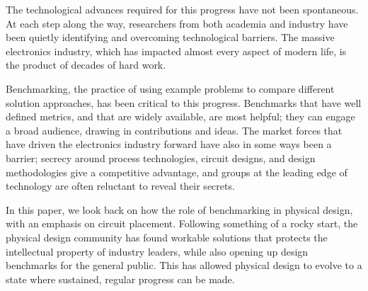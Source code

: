 \documentclass[sigconf]{acmart}
\begin{document}
The technological advances required for this progress
have not been spontaneous.  At each
step along the way, researchers from both academia and
industry have been quietly identifying and overcoming
technological barriers.  The massive electronics industry,
which has impacted almost every aspect of modern life,
is the product of decades of hard work.

Benchmarking, the practice of using example problems to compare
different solution approaches, has been critical to this progress.
Benchmarks that have well defined metrics, and that are widely
available, are most helpful; they can engage a broad audience, drawing
in contributions and ideas.  The market forces that have driven the
electronics industry forward have also in some ways been a barrier;
secrecy
around process technologies, circuit designs, and design methodologies
give a competitive advantage, and groups at the leading edge of
technology are often reluctant to reveal their secrets.

In this paper, we look back on how the role of benchmarking
in physical design, with an emphasis on circuit placement.
Following something of a rocky start, the physical design
community has found workable solutions that protects the
intellectual property of industry leaders, while also
opening up design benchmarks for the general public.
This has allowed
physical design to evolve to a state where sustained,
regular progress can be made.


\iffalse
{\bf How to say this?
  Economic driver pushing technology forward.  Lots of
  companies competing for market share.  Secrecy on
  design technology, circuit designs, gives a competitive
  advantage -- but also limits the number of people who
  can solve the problems that need to be solved.

  For academic researchers in particular to be helpful,
  details of the problems needing solving have to be
  available.  Without test cases, and things that are
  suitable for publication, they cannot assist.
}




Making progress in design automation has been challenging;
the problems addressed are fundamentally hard from a scientific
perspective. Complicating matters further are the financial
implications -- semiconductor manufacturers, design tool companies,
and circuit designers, are all interested in making profits, and
this depends on some degree of secrecy in their work.  At the
same time, solving design problems requires assistance from
others.
\fi
\end{document}

